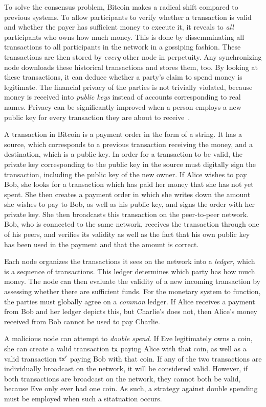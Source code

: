 To solve the consensus problem, Bitcoin makes a radical shift compared to
previous systems. To allow participants to verify whether a transaction is valid
and whether the payer has sufficient money to execute it, it reveals to
\emph{all}
participants who owns how much money. This is done by dissemminating all
transactions to all participants in the network in a gossiping fashion. These
transactions are then stored by \emph{every} other node in perpetuity. Any
synchronizing node downloads these historical transactions and stores them, too.
By looking at these transactions, it can deduce whether a party's claim to spend
money is legitimate. The financial privacy of the parties is not trivially
violated, because money is received into \emph{public keys} instead of accounts
corresponding to real names. Privacy can be significantly improved when a person
employs a new public key for every transaction they are about to
receive~\cite{bitcoin-dev-guide}.

A transaction in Bitcoin is a payment order in the form of a string. It has a
source, which corresponds to a previous transaction receiving the money, and a
destination, which is a public key. In order for a transaction to be valid, the
private key corresponding to the public key in the source must digitally sign the
transaction, including the public key of the new owner. If Alice wishes to pay
Bob, she looks for a transaction which has paid her money that she has not yet
spent. She then creates a payment order in which she writes down the amount she
wishes to pay to Bob, as well as his public key, and signs the order with her
private key. She then broadcasts this transaction on the peer-to-peer network.
Bob, who is connected to the same network, receives the transaction through one
of his peers, and verifies its validity as well as the fact that his own public
key has been used in the payment and that the amount is correct.

Each node organizes the transactions it sees on the network into a
\emph{ledger}, which is a sequence of transactions. This ledger determines which
party has how much money. The node can then evaluate the validity of a new
incoming transaction by assessing whether there are sufficient funds. For the
monetary system to function, the parties must globally agree on a \emph{common}
ledger. If Alice receives a payment from Bob and her ledger depicts this, but
Charlie's does not, then Alice's money received from Bob cannot be used to pay
Charlie.

A malicious node can attempt to \emph{double spend}. If Eve legitimately owns a
coin, she can create a valid transaction $\mathsf{tx}$ paying Alice with that coin, as
well as a valid transaction $\mathsf{tx}'$ paying Bob with that coin. If any of the two
transactions are individually broadcast on the network, it will be considered
valid. However, if both transactions are broadcast on the network, they cannot
both be valid, because Eve only ever had one coin. As such, a strategy against
double spending must be employed when such a sitatuation occurs.

